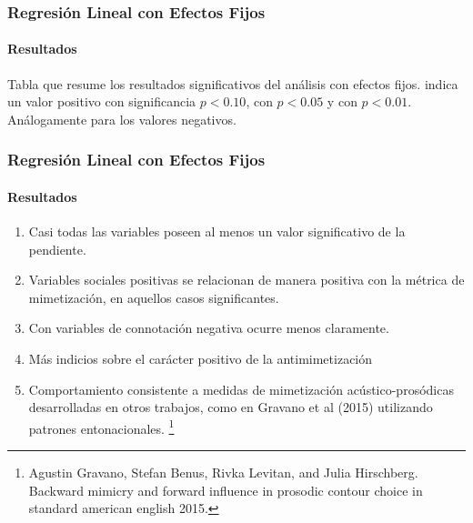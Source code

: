 \begin{frame}
\frametitle{Regresión Lineal con Efectos Fijos}
\framesubtitle{Resultados}

\begin{table}
  
\end{table}

Tabla que resume los resultados significativos del análisis con efectos fijos. \psl indica un valor positivo con significancia $p < 0.10$,  \ppsl con $p < 0.05$  y \pppsl con $p < 0.01$. Análogamente para los valores negativos.

\end{frame}


\begin{frame}
\frametitle{Regresión Lineal con Efectos Fijos}
\framesubtitle{Resultados}
\begin{enumerate}
  \item Casi todas las variables \ap poseen al menos un valor significativo de la pendiente.
  \item Variables sociales positivas se relacionan de manera positiva con la métrica de mimetización, en aquellos casos significantes.
  \item Con variables de connotación negativa ocurre menos claramente.
  \item Más indicios sobre el carácter positivo de la antimimetización
  \item Comportamiento consistente a medidas de mimetización acústico-prosódicas desarrolladas en otros trabajos, como en Gravano et al (2015) utilizando patrones entonacionales. \footnote{Agustin Gravano, Stefan Benus, Rivka Levitan, and Julia Hirschberg. Backward mimicry and forward influence in prosodic contour choice in standard american english 2015.}
\end{enumerate}
\end{frame}
